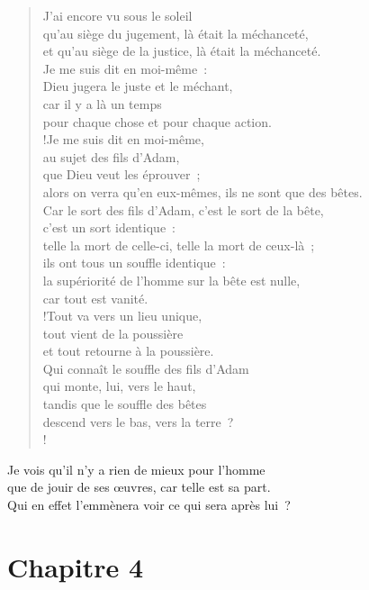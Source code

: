 \documentclass[french,twoside]{book} %
\def\mednobreak{\ifdim\lastskip<\medskipamount
  \removelastskip\nopagebreak\medskip\fi}
\newcommand{\labelblock}[1]{\medbreak{\noindent\color{rubric}\bfseries #1}\par\mednobreak}
\begin{document}
\labelblock{Justice et rétribution}


\begin{verse}
J’ai encore vu sous le soleil \\
qu’au siège du jugement, là était la méchanceté, \\
et qu’au siège de la justice, là était la méchanceté.\\
Je me suis dit en moi-même : \\
Dieu jugera le juste et le méchant, \\
car il y a là un temps \\
pour chaque chose et pour chaque action.\\!Je me suis dit en moi-même, \\
au sujet des fils d’Adam, \\
que Dieu veut les éprouver ; \\
alors on verra qu’en eux-mêmes, ils ne sont que des bêtes.\\
Car le sort des fils d’Adam, c’est le sort de la bête, \\
c’est un sort identique : \\
telle la mort de celle-ci, telle la mort de ceux-là ; \\
ils ont tous un souffle identique : \\
la supériorité de l’homme sur la bête est nulle, \\
car tout est vanité.\\!Tout va vers un lieu unique, \\
tout vient de la poussière \\
et tout retourne à la poussière.\\
Qui connaît le souffle des fils d’Adam \\
qui monte, lui, vers le haut, \\
tandis que le souffle des bêtes \\
descend vers le bas, vers la terre ?\\!
\end{verse}
Je vois qu’il n’y a rien de mieux pour l’homme \\
que de jouir de ses œuvres, car telle est sa part. \\
Qui en effet l’emmènera voir ce qui sera après lui ?\\
\section[Chapitre 4]{Chapitre 4}\renewcommand{\leftmark}{Chapitre 4}
\end{document}
